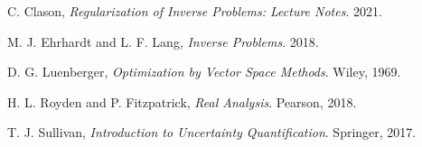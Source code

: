 \documentclass[12pt]{article}
\begin{document}
  
\begin{thebibliography}{20}

 C. Clason, \textit{Regularization of Inverse Problems: Lecture Notes}. 2021.

 M. J. Ehrhardt and L. F. Lang, \textit{Inverse Problems}. 2018.

  D. G. Luenberger, \textit{Optimization by Vector Space Methods}. Wiley, 1969. 

 H. L. Royden and P. Fitzpatrick, \textit{Real Analysis}. Pearson, 2018.

 T. J. Sullivan, \textit{Introduction to Uncertainty Quantification}. Springer, 2017.

\end{thebibliography}
 
\end{document}
